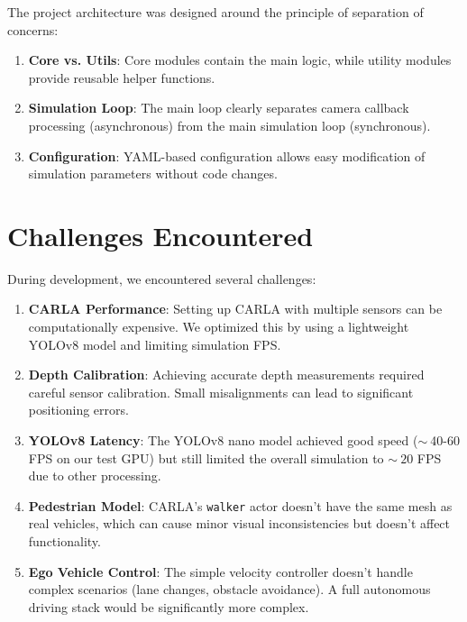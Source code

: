 The project architecture was designed around the principle of separation of concerns:

\begin{enumerate}
    \item \textbf{Core vs. Utils}: Core modules contain the main logic, while utility modules provide reusable helper functions.
    
    \item \textbf{Simulation Loop}: The main loop clearly separates camera callback processing (asynchronous) from the main simulation loop (synchronous).
    
    \item \textbf{Configuration}: YAML-based configuration allows easy modification of simulation parameters without code changes.
\end{enumerate}

\section{Challenges Encountered}

During development, we encountered several challenges:

\begin{enumerate}
    \item \textbf{CARLA Performance}: Setting up CARLA with multiple sensors can be computationally expensive. We optimized this by using a lightweight YOLOv8 model and limiting simulation FPS.
    
    \item \textbf{Depth Calibration}: Achieving accurate depth measurements required careful sensor calibration. Small misalignments can lead to significant positioning errors.
    
    \item \textbf{YOLOv8 Latency}: The YOLOv8 nano model achieved good speed ($\sim~$40-60 FPS on our test GPU) but still limited the overall simulation to $\sim~20$ FPS due to other processing.
    
    \item \textbf{Pedestrian Model}: CARLA's \texttt{walker} actor doesn't have the same mesh as real vehicles, which can cause minor visual inconsistencies but doesn't affect functionality.
    
    \item \textbf{Ego Vehicle Control}: The simple velocity controller doesn't handle complex scenarios (lane changes, obstacle avoidance). A full autonomous driving stack would be significantly more complex.
\end{enumerate}

